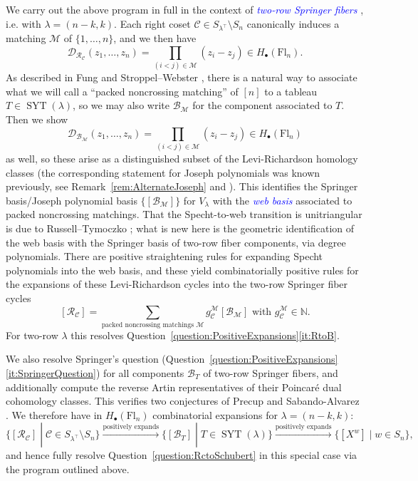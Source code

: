 \documentclass[11pt]{amsart}
\theoremstyle{definition}
\numberwithin{equation}{section}
\newcommand{\suchthat}{\;|\;}
\newcommand{\fl}[1]{\mathrm{Fl}_{#1}}
\renewcommand\emph[1]{\textcolor{blue}{\textit{#1}}} %
\newcommand{\syt}{\operatorname{SYT}} %
\begin{document}
We carry out the above program in full in the context of \emph{two-row Springer fibers} \cite{Fun03,SW12,GNST25}, i.e. with $\lambda=(n-k,k)$. Each right coset  $\mathcal{C}\in S_{\lambda^{\top}}\setminus S_n$ canonically induces a matching $\mathcal{M}$ of $\{1,\dots,n\}$, and we then have
$$\mathcal{D}_{\mathcal{R}_{\mathcal{C}}}(z_1,\ldots,z_n)=\prod_{(i<j)\in \mathcal{M}}(z_i-z_j)\in H_\bullet(\fl{n}).$$
As described in Fung \cite{Fun03} and Stroppel--Webster \cite{SW12}, there is a natural way to associate what we will call a ``packed noncrossing matching'' of $[n]$ to a tableau $T\in \syt(\lambda)$, so we may also write $\mathcal{B}_{\mathcal{M}}$ for the component associated to $T$. Then we show $$\mathcal{D}_{\mathcal{B}_{\mathcal{M}}}(z_1,\ldots,z_n)=\prod_{(i<j)\in \mathcal{M}}(z_i-z_j)\in H_\bullet(\fl{n})$$
as well, so these arise as a distinguished subset of the Levi-Richardson homology classes (the corresponding statement for Joseph polynomials was known previously, see Remark~\ref{rem:AlternateJoseph} and \cite{RTVZJ12}).
This identifies the Springer basis/Joseph polynomial basis $\{[\mathcal{B}_\mathcal{M}]\}$ for $V_\lambda$ with the \emph{web basis} associated to packed noncrossing matchings.
That the Specht-to-web transition is unitriangular is due to Russell--Tymoczko \cite{RT19}; what is new here is the geometric identification of the web basis with the Springer basis of two-row fiber components, via degree polynomials.
There are positive straightening rules \cite{Rho19} for expanding Specht polynomials into the web basis, and these yield combinatorially positive rules for the expansions of these Levi-Richardson cycles into the two-row Springer fiber cycles
$$[\mathcal{R}_{\mathcal{C}}]=\sum_{\text{packed noncrossing matchings } \mathcal{M}} g^{\mathcal{M}}_{\mathcal{C}}[\mathcal{B}_{\mathcal{M}}]\text{ with }g_{\mathcal{C}}^{\mathcal{M}}\in \mathbb{N}.$$
For two-row $\lambda$ this resolves Question~\ref{question:PositiveExpansions}\eqref{it:RtoB}.



We also resolve Springer's question (Question~\ref{question:PositiveExpansions}\eqref{it:SpringerQuestion}) for all components $\mathcal{B}_T$ of two-row Springer fibers, and additionally compute the reverse Artin representatives of their Poincar\'e dual cohomology classes. This verifies two conjectures of Precup and Sabando-Alvarez \cite[Conjectures 1,2]{sabandoalvarez2026idealsdefiningcomponentstworow}.
We therefore have in $H_\bullet(\fl{n})$ combinatorial expansions for $\lambda=(n-k,k)$:
$$\{[\mathcal{R}_{\mathcal{C}}]\suchthat \mathcal{C}\in S_{\lambda^{\top}}\setminus S_n\}\xrightarrow{\text{positively expands}}\{[\mathcal{B}_{T}]\suchthat T\in \syt(\lambda)\} \xrightarrow{\text{positively expands}}\{[X^w]\suchthat w\in S_n\},$$
and hence fully resolve Question~\ref{question:RctoSchubert} in this special case via the program outlined above.
\end{document}
